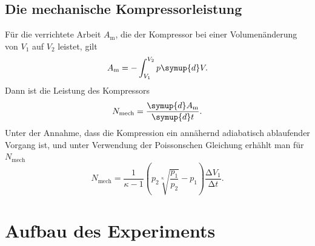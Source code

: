 \documentclass{scrartcl} %
\begin{document}
  \subsection{Die mechanische Kompressorleistung}
    Für die verrichtete Arbeit $A_\text{m}$, die der Kompressor bei einer Volumenänderung von $V_\text{1}$ auf $V_\text{2}$ leistet, gilt
    \begin{equation}
      A_\text{m} = -\int_{V_\text{1}}^{V_\text{2}} p \symup{d}V.
    \label{eqn:arbeitkompressor}
    \end{equation}
    Dann ist die Leistung des Kompressors
    \begin{equation}
      N_\text{mech} = \frac{\symup{d} A_\text{m}}{\symup{d} t}.
      \label{eqn:leistungkompressor1}
    \end{equation}
    Unter der Annahme, dass die Kompression ein annähernd adiabatisch ablaufender Vorgang ist, und unter Verwendung der Poissonschen Gleichung erhählt man für $N_\text{mech}$
    \begin{equation}
      N_\text{mech} = \frac{1}{\kappa - 1}  \left(p_\text{2} \sqrt[\kappa]{\frac{p_\text{1}}{p_\text{2}}} - p_\text{1} \right)  \frac{\increment V_\text{1}}{\increment t}.
      \label{eqn:leistungkompressor2}
    \end{equation}
\section{Aufbau des Experiments}
\end{document}
